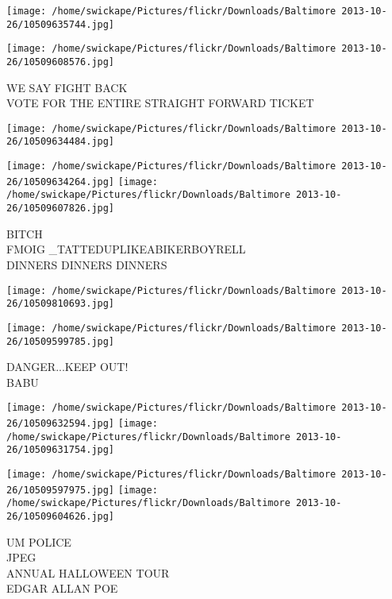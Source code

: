 \documentclass[10pt,letterpaper]{article}
\begin{document}
\texttt{[image: /home/swickape/Pictures/flickr/Downloads/Baltimore 2013-10-26/10509635744.jpg]}

\vspace{0.25in}
\texttt{[image: /home/swickape/Pictures/flickr/Downloads/Baltimore 2013-10-26/10509608576.jpg]}

WE SAY FIGHT BACK\\
VOTE FOR THE ENTIRE STRAIGHT FORWARD TICKET\\
\pagebreak

\texttt{[image: /home/swickape/Pictures/flickr/Downloads/Baltimore 2013-10-26/10509634484.jpg]}

\vspace{0.25in}
\texttt{[image: /home/swickape/Pictures/flickr/Downloads/Baltimore 2013-10-26/10509634264.jpg]}
\texttt{[image: /home/swickape/Pictures/flickr/Downloads/Baltimore 2013-10-26/10509607826.jpg]}

BITCH\\
FMOIG \_TATTEDUPLIKEABIKERBOYRELL\\
DINNERS DINNERS DINNERS\\
\pagebreak

\texttt{[image: /home/swickape/Pictures/flickr/Downloads/Baltimore 2013-10-26/10509810693.jpg]}

\vspace{0.25in}
\texttt{[image: /home/swickape/Pictures/flickr/Downloads/Baltimore 2013-10-26/10509599785.jpg]}

DANGER...KEEP OUT!\\
BABU\\
\pagebreak

\texttt{[image: /home/swickape/Pictures/flickr/Downloads/Baltimore 2013-10-26/10509632594.jpg]}
\texttt{[image: /home/swickape/Pictures/flickr/Downloads/Baltimore 2013-10-26/10509631754.jpg]}

\texttt{[image: /home/swickape/Pictures/flickr/Downloads/Baltimore 2013-10-26/10509597975.jpg]}
\texttt{[image: /home/swickape/Pictures/flickr/Downloads/Baltimore 2013-10-26/10509604626.jpg]}

UM POLICE\\
JPEG\\
ANNUAL HALLOWEEN TOUR\\
EDGAR ALLAN POE\\
\pagebreak
\end{document}
